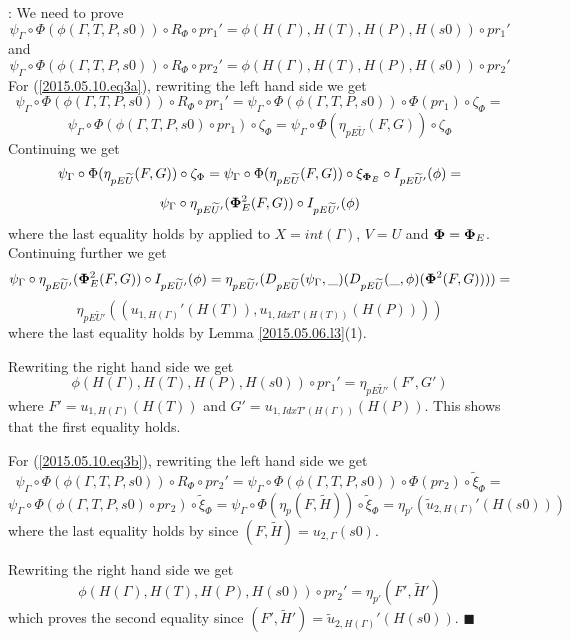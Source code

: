 \documentclass[12pt]{article}
\numberwithin{equation}{section}
\newenvironment{eq}{\begin{equation}}{\end{equation}}
\newenvironment{myproof}{{\bf Proof}:}{$\blacksquare$ \vskip 5mm }
\newcommand{\llabel}[1]{\label{#1}}
\newcommand{\wt}{\widetilde}
\begin{document}
\begin{myproof}
We need to prove
%
\begin{eq}
\llabel{2015.05.10.eq3a} \psi_{\Gamma}\circ \Phi(\phi(\Gamma,T,P,s0))\circ
R_{\Phi}\circ pr_1' = \phi(H(\Gamma),H(T),H(P),H(s0))\circ pr_1'
\end{eq}
%
and
%
%
\begin{eq}
\llabel{2015.05.10.eq3b} \psi_{\Gamma}\circ \Phi(\phi(\Gamma,T,P,s0))\circ
R_{\Phi}\circ pr_2' = \phi(H(\Gamma),H(T),H(P),H(s0))\circ pr_2'
\end{eq}
%
For (\ref{2015.05.10.eq3a}), rewriting the left hand side we get
%
$$\psi_{\Gamma}\circ \Phi(\phi(\Gamma,T,P,s0))\circ R_{\Phi}\circ pr_1' =
\psi_{\Gamma}\circ \Phi(\phi(\Gamma,T,P,s0))\circ\Phi(pr_1)\circ
\zeta_{\Phi}=$$
$$\psi_{\Gamma}\circ \Phi(\phi(\Gamma,T,P,s0)\circ pr_1)\circ
\zeta_{\Phi}=\psi_{\Gamma}\circ \Phi(\eta_{pE\wt{U}}(F,G))\circ \zeta_{\Phi}$$
%
Continuing we get
%
$$\psi_{\Gamma}\circ \Phi(\eta_{pE\wt{U}}(F,G))\circ
\zeta_{\Phi}=\psi_{\Gamma}\circ \Phi(\eta_{pE\wt{U}}(F,G))\circ \xi_{{\bf
    \Phi}_E}\circ I_{pE\wt{U}'}(\phi)=$$
$$\psi_{\Gamma}\circ\eta_{pE\wt{U}'}({\bf\Phi}^2_E(F,G))\circ
I_{pE\wt{U}'}(\phi)$$
%
where the last equality holds by \cite[Lemma 5.8]{fromunivwithPi} applied to
$X=int(\Gamma)$, $V=U$ and ${\bf\Phi}={\bf\Phi}_E$. Continuing further we get
%
$$\psi_{\Gamma}\circ\eta_{pE\wt{U}'}({\bf\Phi}^2_E(F,G))\circ
I_{pE\wt{U}'}(\phi)=\eta_{pE\wt{U}'}(D_{pE\wt{U}}(\psi_{\Gamma},\_)(D_{pE\wt{U}}(\_,\phi)({\bf\Phi}^2(F,G))))=$$$$\eta_{pE\wt{U}'}((u_{1,H(\Gamma)}'(H(T)),u_{1,IdxT'(H(T))}(H(P))))$$
%
where the last equality holds by Lemma \ref{2015.05.06.l3}(1).

Rewriting the right hand side we get
%
$$\phi(H(\Gamma),H(T),H(P),H(s0))\circ pr_1'=\eta_{pE\wt{U}'}(F',G')$$
%
where $F'=u_{1,H(\Gamma)}(H(T))$ and $G'=u_{1,IdxT'(H(\Gamma))}(H(P))$.  This
shows that the first equality holds.

For (\ref{2015.05.10.eq3b}), rewriting the left hand side we get
%
$$\psi_{\Gamma}\circ \Phi(\phi(\Gamma,T,P,s0))\circ R_{\Phi}\circ pr_2' =
\psi_{\Gamma}\circ \Phi(\phi(\Gamma,T,P,s0))\circ \Phi(pr_2)\circ
\wt{\xi}_{\Phi}=$$
$$\psi_{\Gamma}\circ \Phi(\phi(\Gamma,T,P,s0)\circ pr_2)\circ
\wt{\xi}_{\Phi}=\psi_{\Gamma}\circ \Phi(\eta_p(F,\wt{H}))\circ
\wt{\xi}_{\Phi}=\eta_{p'}(\wt{u}_{2,H(\Gamma)}'(H(s0)))$$
%
where the last equality holds by \cite[Lemma 6.2(2)]{fromunivwithPi} since
$(F,\wt{H})=u_{2,\Gamma}(s0)$.

Rewriting the right hand side we get
%
$$\phi(H(\Gamma),H(T),H(P),H(s0))\circ pr_2'=\eta_{p'}(F',\wt{H}')$$
%
which proves the second equality since
$(F',\wt{H}')=\wt{u}_{2,H(\Gamma)}'(H(s0))$.
\end{myproof}





\end{document}
